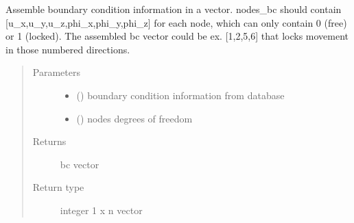 \documentclass[letterpaper,10pt,english]{sphinxmanual}
\begin{document}
\begin{fulllineitems}
\label{\detokenize{api:beamon.core.assemble_bc}}
Assemble boundary condition information in a vector.
nodes\_bc should contain {[}u\_x,u\_y,u\_z,phi\_x,phi\_y,phi\_z{]} for each node, which can only contain
0 (free) or 1 (locked).
The assembled bc vector could be ex. {[}1,2,5,6{]} that locks movement in those numbered directions.
\begin{quote}\begin{description}
\item[{Parameters}] \leavevmode\begin{itemize}
\item {} 
 () \textendash{} boundary condition information from database

\item {} 
 () \textendash{} nodes degrees of freedom

\end{itemize}

\item[{Returns}] \leavevmode
bc vector

\item[{Return type}] \leavevmode
integer 1 x n vector

\end{description}\end{quote}

\end{fulllineitems}

\end{document}
